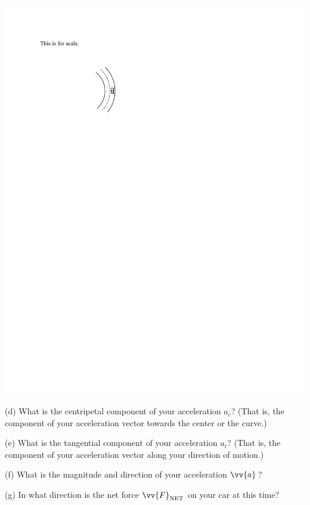 \hspace{1.0in}\includegraphics{tangential_and_centripetal_acc/curve2.pdf}

(d) What is the centripetal component of your acceleration $a_c$?  (That is, the component of your acceleration vector towards the center or the curve.)
\answerspace{0.3in}

(e) What is the tangential component of your acceleration $a_t$?  (That is, the component of your acceleration vector along your direction of motion.)
\answerspace{0.3in}

(f) What is the magnitude and direction of your acceleration $\vv{a}\,$?
\answerspace{1.5in}

(g) In what direction is the net force $\vv{F}_{\rm NET}$ on your car at this time?
\answerspace{0.5in}



